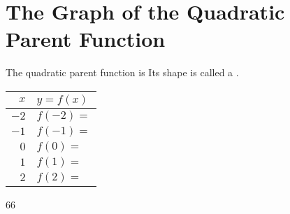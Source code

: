 \section{The Graph of the Quadratic Parent Function}

The quadratic parent function is 
\myCenteredBox[width=1.75in,valign=center]{
    \large
    \vspace{-1.2em}
    \[ f(x) = x^2 \]
}
%
Its shape is called a .

\begin{minipage}{0.5\textwidth}
    \centering 
    \renewcommand{\arraystretch}{1.75}
    \begin{tabular}{r|p{2in}}
        $x$ & $y = f(x)$ \\ \hline\hline
        $-2$ & $f(-2) = $\\ \hline
        $-1$ & $f(-1) = $\\ \hline
        $0$ & $f(0) = $  \\ \hline
        $1$ & $f(1) = $  \\ \hline
        $2$ & $f(2) = $  \\ \hline
    \end{tabular}
\end{minipage}
\begin{minipage}{0.5\textwidth}
    \centering
    \begin{myTikzpictureGrid}{0.4} {6}{6}
    \end{myTikzpictureGrid}
\end{minipage}
